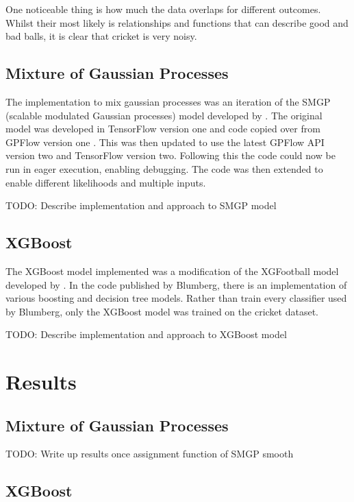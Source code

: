 \documentclass[12pt,a4paper]{report}
\theoremstyle{definition}
\begin{document}
One noticeable thing is how much the data overlaps for different outcomes. 
Whilst their most likely is relationships and functions that can describe good and bad balls, it is clear that cricket is very noisy.

\section{Mixture of Gaussian Processes}

The implementation to mix gaussian processes was an iteration of the SMGP (scalable modulated Gaussian processes) model developed by \citet{Lui2020}.
The original model was developed in TensorFlow version one and code copied over from GPFlow version one \citep{GPflow2017}.
This was then updated to use the latest GPFlow API version two and TensorFlow version two. 
Following this the code could now be run in eager execution, enabling debugging.
The code was then extended to enable different likelihoods and multiple inputs.

TODO: Describe implementation and approach to SMGP model

\section{XGBoost}

The XGBoost \citep{Chen2016} model implemented was a modification of the XGFootball model developed by \citet{Blumberg2020}.
In the code published by Blumberg, there is an implementation of various boosting and decision tree models.
Rather than train every classifier used by Blumberg, only the XGBoost model was trained on the cricket dataset.

TODO: Describe implementation and approach to XGBoost model

\chapter{Results}

\section{Mixture of Gaussian Processes}

TODO: Write up results once assignment function of SMGP smooth

\section{XGBoost}
\end{document}
